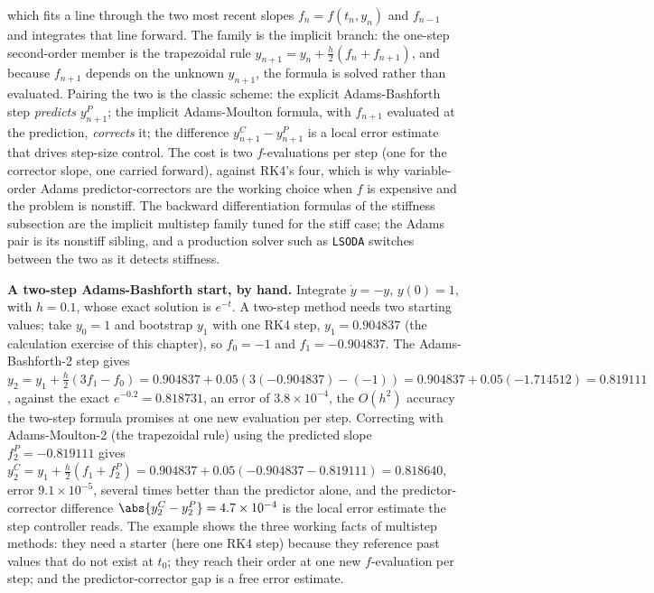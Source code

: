 which fits a line through the two most recent slopes $f_{n} = f(t_{n}, y_{n})$
and $f_{n-1}$ and integrates that line forward. The 
family is the implicit branch: the one-step second-order member is the
trapezoidal rule $y_{n+1} = y_{n} + \tfrac{h}{2}(f_{n} + f_{n+1})$, and
because $f_{n+1}$ depends on the unknown $y_{n+1}$, the formula is solved
rather than evaluated. Pairing the two is the classic
 scheme: the explicit Adams-Bashforth step
\emph{predicts} $y_{n+1}^{P}$; the implicit Adams-Moulton formula, with
$f_{n+1}$ evaluated at the prediction, \emph{corrects} it; the difference
$y_{n+1}^{C} - y_{n+1}^{P}$ is a local error estimate that drives step-size
control. The cost is two $f$-evaluations per step (one for the corrector
slope, one carried forward), against RK4's four, which is why
variable-order Adams predictor-correctors are the working choice when $f$ is
expensive and the problem is nonstiff. The backward differentiation
formulas of the stiffness subsection are the implicit multistep family
tuned for the stiff case; the Adams pair is its nonstiff sibling, and a
production solver such as \texttt{LSODA} switches between the two as it
detects stiffness.

\begin{example}
\textbf{A two-step Adams-Bashforth start, by hand.} Integrate $\dot y = -y$,
$y(0) = 1$, with $h = 0.1$, whose exact solution is $e^{-t}$. A two-step
method needs two starting values; take $y_{0} = 1$ and bootstrap $y_{1}$
with one RK4 step, $y_{1} = 0.904837$ (the calculation exercise of this
chapter), so $f_{0} = -1$ and $f_{1} = -0.904837$. The Adams-Bashforth-2
step gives $y_{2} = y_{1} + \tfrac{h}{2}(3 f_{1} - f_{0}) = 0.904837 +
0.05(3(-0.904837) - (-1)) = 0.904837 + 0.05(-1.714512) = 0.819111$, against
the exact $e^{-0.2} = 0.818731$, an error of $3.8 \times 10^{-4}$, the
$O(h^{2})$ accuracy the two-step formula promises at one new evaluation per
step. Correcting with Adams-Moulton-2 (the trapezoidal rule) using the
predicted slope $f_{2}^{P} = -0.819111$ gives $y_{2}^{C} = y_{1} +
\tfrac{h}{2}(f_{1} + f_{2}^{P}) = 0.904837 + 0.05(-0.904837 - 0.819111) =
0.818640$, error $9.1 \times 10^{-5}$, several times better than the predictor
alone, and the predictor-corrector difference $\abs{y_{2}^{C} - y_{2}^{P}}
= 4.7 \times 10^{-4}$ is the local error estimate the step controller reads.
The example shows the three working facts of multistep methods: they need a
starter (here one RK4 step) because they reference past values that do not
exist at $t_{0}$; they reach their order at one new $f$-evaluation per step;
and the predictor-corrector gap is a free error estimate.
\end{example}


